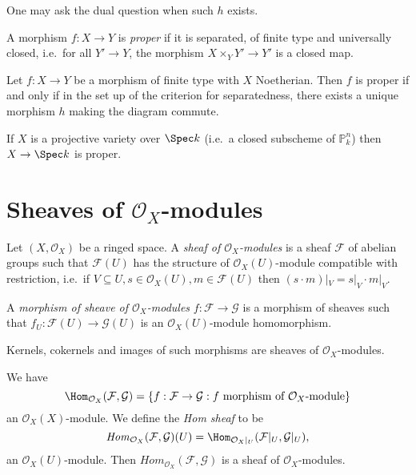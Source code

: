 \documentclass[a4paper]{article}
\renewcommand*{\P}{\mathbb{P}}
\newcommand{\sh}[1]{\mathcal{#1}} %
\begin{document}
One may ask the dual question when such \(h\) exists.

\begin{definition}
  A morphism \(f: X \to Y\) is \emph{proper} if it is separated, of finite type and universally closed, i.e.\ for all \(Y' \to Y\), the morphism \(X \times_Y Y' \to Y'\) is a closed map.
\end{definition}

\begin{proposition}
   Let \(f: X \to Y\) be a morphism of finite type with \(X\) Noetherian. Then \(f\) is proper if and only if in the set up of the criterion for separatedness, there exists a unique morphism \(h\) making the diagram commute.
\end{proposition}

\begin{eg}
  If \(X\) is a projective variety over \(\Spec k\) (i.e.\ a closed subscheme of \(\P_k^n\)) then \(X \to \Spec k\) is proper.
\end{eg}

\section{Sheaves of \(\sh O_X\)-modules}

\begin{definition}
  Let \((X, \sh O_X)\) be a ringed space. A \emph{sheaf of \(\sh O_X\)-modules} is a sheaf \(\sh F\) of abelian groups such that \(\sh F(U)\) has the structure of \(\sh O_X(U)\)-module compatible with restriction, i.e.\ if \(V \subseteq U, s \in \sh O_X(U), m \in \sh F(U)\) then \((s \cdot m)|_V = s|_V \cdot m|_V\).

  A \emph{morphism of sheave of \(\sh O_X\)-modules} \(f: \sh F \to \sh G\) is a morphism of sheaves such that \(f_U: \sh F(U) \to \sh G(U)\) is an \(\sh O_X(U)\)-module homomorphism.
\end{definition}

Kernels, cokernels and images of such morphisms are sheaves of \(\sh O_X\)-modules.

We have
\[
  \Hom_{\sh O_X}(\sh F, \sh G) = \{f: \sh F \to \sh G: f \text{ morphism of }\sh O_X\text{-module}\}
\]
an \(\sh O_X(X)\)-module. We define the \emph{Hom sheaf} to be
\[
  \mathit{Hom}_{\sh O_X}(\sh F, \sh G)(U) = \Hom_{\sh O_X|_U}(\sh F|_U, \sh G|_U),
\]
an \(\sh O_X(U)\)-module. Then \(Hom_{\sh O_X}(\sh F, \sh G)\) is a sheaf of \(\sh O_X\)-modules.
\end{document}
